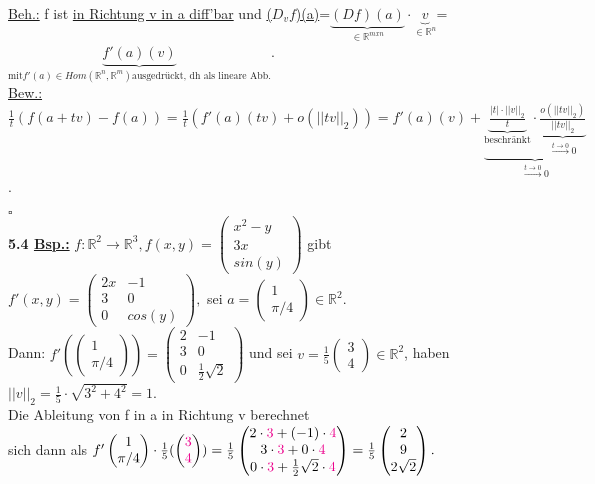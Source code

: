\documentclass[]{scrartcl}
\begin{document}
	\underline{Beh.:} f ist \ul{in Richtung v in a diff'bar} und 
	\ul{($D_vf$)(a)}=\ul{$\underbrace{(Df)(a)}_{\in\mathbb{R}^{m x n}}\cdot 
	\underbrace{v}_{\in\mathbb{R}^n}$}=$\underbrace{f'(a)(v)}_{\text{mit} 
	f'(a)\in Hom(\mathbb{R}^n,\mathbb{R}^m)\text{ausgedrückt, dh als lineare 
	Abb.}}$.\\
	\underline{Bew.:}$\frac{1}{t}(f(a+tv)-f(a))=\frac{1}{t}(f'(a)(tv)+o(||tv||_2))=
	 f'(a)(v)+\underbrace{\underbrace{\frac{|t|\cdot||v||_2}{t}}_{\text{beschränkt}}
	  \cdot 
	 \underbrace{\frac{o(||tv||_2)}{||tv||_2}}_{\xrightarrow{t\rightarrow0}0}}_{\xrightarrow{t\rightarrow0}0}
	$.\\
	\strut\hfill$\square$\\
	\textbf{5.4 \underline{Bsp.:}} $f:\mathbb{R}^2\rightarrow\mathbb{R}^3, f(x,y)=\begin{pmatrix}
		x^2-y\\3x\\sin(y)
	\end{pmatrix}$ gibt $f'(x,y)=\begin{pmatrix}
		2x&-1\\3&0\\0&cos(y)
	\end{pmatrix},$ sei $a=\begin{pmatrix}
		1\\\pi/4
	\end{pmatrix}\in \mathbb{R}^2.$\\
	Dann: $f'(\begin{pmatrix}
		1\\\pi/4
	\end{pmatrix})=\begin{pmatrix}
		2&-1\\3&0\\0&\frac{1}{2}\sqrt{2}
	\end{pmatrix}$ und sei $v=\frac{1}{5}\begin{pmatrix}
		3\\4
	\end{pmatrix}\in\mathbb{R}^2$, haben $||v||_2=\frac{1}{5}\cdot \sqrt{3^2+4^2}=1.$\\
	Die Ableitung von f in a in Richtung v berechnet\\
	sich dann als $f'\begin{pmatrix}
		1\\\pi/4
	\end{pmatrix}\cdot \frac{1}{5}(\begin{pmatrix}
		\textcolor{magenta}{3}\\\textcolor{magenta}{4}
	\end{pmatrix})=\frac{1}{5}\begin{pmatrix}
		2\cdot \textcolor{magenta}{3}+(-1)\cdot \textcolor{magenta}{4}\\
		3\cdot \textcolor{magenta}{3}+0\cdot \textcolor{magenta}{4}\\
		0\cdot \textcolor{magenta}{3}+\frac{1}{2}\sqrt{2}\cdot \textcolor{magenta}{4}
	\end{pmatrix}=\frac{1}{5}\begin{pmatrix}
		2\\9\\2\sqrt{2}
	\end{pmatrix}.$\\
\end{document}
